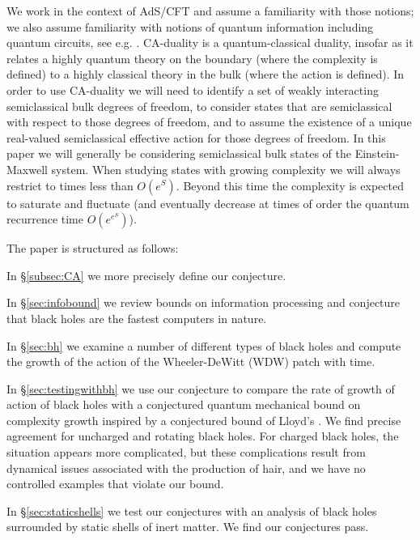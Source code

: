 \documentclass[12pt]{article}
\numberwithin{equation}{section}
\begin{document}
We work in the context of AdS/CFT and assume a familiarity with those notions; we also assume familiarity with notions of quantum information including quantum circuits, see e.g. \cite{complexityreview1,complexityreview2}. CA-duality is a quantum-classical duality, insofar as it relates a highly quantum theory on the boundary (where the complexity is defined) to a highly classical theory in the bulk (where the action is defined). %
%
%
%
In order to use CA-duality we will need to identify a set of weakly interacting semiclassical bulk degrees of freedom, to consider states that are semiclassical with respect to those degrees of freedom, and  to assume the existence of a unique real-valued semiclassical effective action for those degrees of freedom. In this paper we will generally be considering semiclassical bulk states of the Einstein-Maxwell system.
%
When studying states with growing complexity we will always restrict to times less than $O(e^S)$. Beyond this time the complexity is expected to saturate and fluctuate (and eventually decrease at times of order the quantum recurrence time $O(e^{e^S})$).

The paper is structured as follows:

In \S\ref{subsec:CA} we more precisely define our conjecture.

In \S\ref{sec:infobound} we review bounds on information processing and conjecture that black holes are the fastest computers in nature.

In \S\ref{sec:bh} we examine a number of different types of black holes and compute the growth of the action of the Wheeler-DeWitt (WDW) patch with time.

In \S\ref{sec:testingwithbh} we use our conjecture to compare the rate of growth of action of black holes with a conjectured quantum mechanical bound on complexity growth inspired by a conjectured bound of Lloyd's \cite{lloyd2000ultimate}. We find precise agreement for uncharged and rotating black holes. For charged black holes, the situation appears more complicated, but these complications result from  dynamical issues associated with the production of hair, and we have no controlled examples that violate our bound.



In \S\ref{sec:staticshells} we test our conjectures with an analysis of black holes surrounded by static shells of inert matter. We find our conjectures pass.
\end{document}
